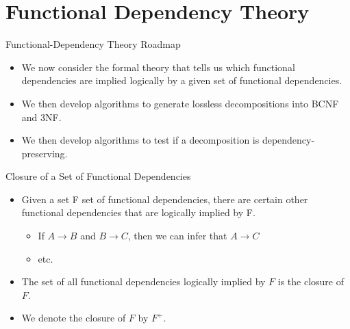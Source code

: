 \documentclass{beamer}
\begin{document}
\section{Functional Dependency Theory}

\begin{frame}{Functional-Dependency Theory Roadmap}
    \begin{itemize}
        \item We now consider the formal theory that tells us which functional dependencies are implied logically by a given set of functional dependencies.
        \item We then develop algorithms to generate lossless decompositions into BCNF and 3NF.
        \item We then develop algorithms to test if a decomposition is dependency-preserving.
    \end{itemize}
\end{frame}

\begin{frame}{Closure of a Set of Functional Dependencies}
    \begin{itemize}
        \item Given a set F set of functional dependencies, there are certain other functional dependencies that are logically implied by F.
            \begin{itemize}
                \item If $A \rightarrow B$ and $B \rightarrow C$, then we can infer that $A \rightarrow C$
                \item etc.
            \end{itemize}
        \item The set of all functional dependencies logically implied by $F$ is the closure of $F$.
        \item We denote the closure of $F$ by $F^+$.
    \end{itemize}
\end{frame}
\end{document}
